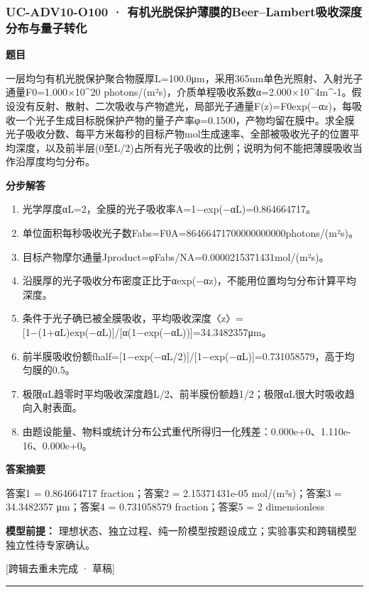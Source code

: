 \documentclass[UTF8,11pt,a4paper]{ctexart}
\begin{document}
\subsubsection*{UC-ADV10-O100 · 有机光脱保护薄膜的Beer–Lambert吸收深度分布与量子转化}
\noindent\textbf{题目}\par
一层均匀有机光脱保护聚合物膜厚L=100.0μm，采用365nm单色光照射、入射光子通量F0=1.000×10\textasciicircum{}20 photons/(m²s)，介质单程吸收系数α=2.000×10\textasciicircum{}4m\textasciicircum{}-1。假设没有反射、散射、二次吸收与产物遮光，局部光子通量F(z)=F0exp(−αz)，每吸收一个光子生成目标脱保护产物的量子产率φ=0.1500，产物均留在膜中。求全膜光子吸收分数、每平方米每秒的目标产物mol生成速率、全部被吸收光子的位置平均深度，以及前半层(0至L/2)占所有光子吸收的比例；说明为何不能把薄膜吸收当作沿厚度均匀分布。\par
\medskip\noindent\textbf{分步解答}
\begin{enumerate}
\item 光学厚度αL=2，全膜的光子吸收率A=1−exp(−αL)=0.864664717。
\item 单位面积每秒吸收光子数Fabs=F0A=86466471700000000000photons/(m²s)。
\item 目标产物摩尔通量Jproduct=φFabs/NA=0.0000215371431mol/(m²s)。
\item 沿膜厚的光子吸收分布密度正比于αexp(−αz)，不能用位置均匀分布计算平均深度。
\item 条件于光子确已被全膜吸收，平均吸收深度〈z〉=[1−(1+αL)exp(−αL)]/[α(1−exp(−αL))]=34.3482357μm。
\item 前半膜吸收份额fhalf=[1−exp(−αL/2)]/[1−exp(−αL)]=0.731058579，高于均匀膜的0.5。
\item 极限αL趋零时平均吸收深度趋L/2、前半膜份额趋1/2；极限αL很大时吸收趋向入射表面。
\item 由题设能量、物料或统计分布公式重代所得归一化残差：0.000e+0、1.110e-16、0.000e+0。
\end{enumerate}
\noindent\textbf{答案摘要}\par
答案1 = 0.864664717 fraction；答案2 = 2.15371431e-05 mol/(m²s)；答案3 = 34.3482357 μm；答案4 = 0.731058579 fraction；答案5 = 2 dimensionless\par
\noindent\textbf{模型前提：}
理想状态、独立过程、纯一阶模型按题设成立；实验事实和跨辑模型独立性待专家确认。\par
\noindent\textcolor{red!65!black}{[跨辑去重未完成 · 草稿]} \par
\medskip\hrule\medskip
{}
\end{document}
